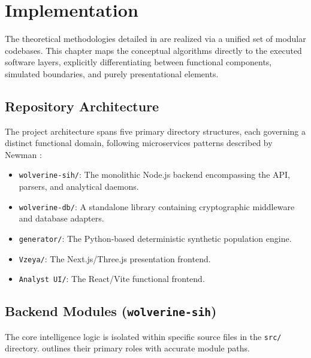 \chapter{Implementation}
\label{ch:implementation}

The theoretical methodologies detailed in  are realized via a unified set of modular codebases. This chapter maps the conceptual algorithms directly to the executed software layers, explicitly differentiating between functional components, simulated boundaries, and purely presentational elements.

\section{Repository Architecture}
\label{sec:impl-repository}
The project architecture spans five primary directory structures, each governing a distinct functional domain, following microservices patterns described by Newman \cite{newman2021building}:
\begin{itemize}
    \item \texttt{wolverine-sih/}: The monolithic Node.js backend encompassing the API, parsers, and analytical daemons.
    \item \texttt{wolverine-db/}: A standalone library containing cryptographic middleware and database adapters.
    \item \texttt{generator/}: The Python-based deterministic synthetic population engine.
    \item \texttt{Vzeya/}: The Next.js/Three.js presentation frontend.
    \item \texttt{Analyst UI/}: The React/Vite functional frontend.
\end{itemize}

\section{Backend Modules (\texttt{wolverine-sih})}
\label{sec:impl-backend}
The core intelligence logic is isolated within specific source files in the \texttt{src/} directory.  outlines their primary roles with accurate module paths.

